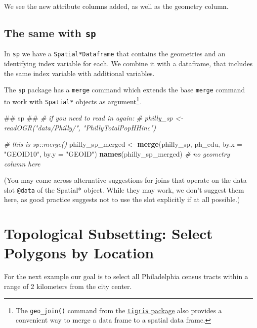 \documentclass[]{book}
\newenvironment{Shaded}{\begin{snugshade}}{\end{snugshade}}
\newcommand{\KeywordTok}[1]{\textcolor[rgb]{0.13,0.29,0.53}{\textbf{#1}}}
\newcommand{\DataTypeTok}[1]{\textcolor[rgb]{0.13,0.29,0.53}{#1}}
\newcommand{\StringTok}[1]{\textcolor[rgb]{0.31,0.60,0.02}{#1}}
\newcommand{\CommentTok}[1]{\textcolor[rgb]{0.56,0.35,0.01}{\textit{#1}}}
\newcommand{\NormalTok}[1]{#1}
\let\rmarkdownfootnote\footnote%
\def\footnote{\protect\rmarkdownfootnote}
\begin{document}
We see the new attribute columns added, as well as the geometry column.

\subsection{\texorpdfstring{The same with
\texttt{sp}}{The same with sp}}\label{the-same-with-sp}

In \texttt{sp} we have a \texttt{Spatial*Dataframe} that contains the
geometries and an identifying index variable for each. We combine it
with a dataframe, that includes the same index variable with additional
variables.

The \texttt{sp} package has a \texttt{merge} command which extends the
base \texttt{merge} command to work with \texttt{Spatial*} objects as
argument\footnote{The \texttt{geo\_join()} command from the
  \href{https://cran.r-project.org/web/packages/tigris/index.html}{\texttt{tigris}
  package} also provides a convenient way to merge a data frame to a
  spatial data frame.}.

\begin{Shaded}
\begin{Highlighting}[]
\NormalTok{## sp ##}
\CommentTok{# if you need to read in again:}
\CommentTok{# philly_sp <- readOGR("data/Philly/", "PhillyTotalPopHHinc") }

\CommentTok{# this is sp::merge()}
\NormalTok{philly_sp_merged <-}\StringTok{ }\KeywordTok{merge}\NormalTok{(philly_sp, ph_edu, }\DataTypeTok{by.x =} \StringTok{"GEOID10"}\NormalTok{, }\DataTypeTok{by.y =} \StringTok{"GEOID"}\NormalTok{)}
\KeywordTok{names}\NormalTok{(philly_sp_merged) }\CommentTok{# no geometry column here}
\end{Highlighting}
\end{Shaded}

(You may come across alternative suggestions for joins that operate on
the data slot \texttt{@data} of the Spatial* object. While they may
work, we don't suggest them here, as good practice suggests not to use
the slot explicitly if at all possible.)

\section{Topological Subsetting: Select Polygons by
Location}\label{topological-subsetting-select-polygons-by-location}

For the next example our goal is to select all Philadelphia census
tracts within a range of 2 kilometers from the city center.
\end{document}
